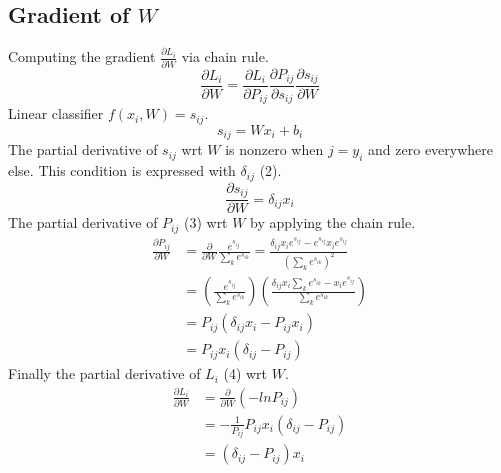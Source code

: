 \documentclass[12pt, letter]{article}
\begin{document}
\subsection{Gradient of $W$}
Computing the gradient $\frac{\partial L_i}{\partial W}$ via chain rule.
\begin{equation}\nonumber
  \frac{\partial L_i}{\partial W} =
  \frac{\partial L_i}{\partial P_{ij}} \frac{\partial P_{ij}}{\partial s_{ij}} \frac{\partial s_{ij}}{\partial W}
\end{equation}
Linear classifier $f(x_i, W) = s_{ij}$.
\begin{equation}
  s_{ij} = Wx_i + b_i
\end{equation}
The partial derivative of $s_{ij}$ wrt $W$ is nonzero when $j=y_i$
and zero everywhere else. This condition is expressed with $\delta_{ij}$ (2).
\begin{equation}\nonumber
  \frac{\partial s_{ij}}{\partial W} = \delta_{ij} x_i
\end{equation}
The partial derivative of $P_{ij}$ (3) wrt $W$ by applying the chain rule.
\begin{equation}\nonumber
\begin{split}
  \frac{\partial P_{ij}}{\partial W}& = \frac{\partial}{\partial W}\frac{e^{s_{ij}}}{\sum_ke^{s_{ik}}} = \frac{\delta_{ij}x_ie^{s_{ij}}-e^{s_{ij}}x_ie^{s_{ij}}}{\left(\sum_ke^{s_{ik}}\right)^2}\\
  & = \left(\frac{e^{s_{ij}}}{\sum_ke^{s_{ik}}}\right)\left(\frac{\delta_{ij}x_i\sum_ke^{s_{ik}}-x_ie^{s_{ij}}}{\sum_ke^{s_{ik}}}\right)\\
  & = P_{ij} (\delta_{ij}x_i - P_{ij}x_i) \\
  & = P_{ij}x_i(\delta_{ij} - P_{ij})
\end{split}
\end{equation}
Finally the partial derivative of $L_i$ (4) wrt $W$.
\begin{equation}
\begin{split}
  \frac{\partial L_i}{\partial W}& = \frac{\partial}{\partial W}\left(-lnP_{ij}\right)\\
  & = -\frac{1}{P_{ij}} P_{ij}x_i(\delta_{ij} - P_{ij})\\
  & = (\delta_{ij} - P_{ij}) x_i
\end{split}
\end{equation}
\pagebreak
\end{document}
